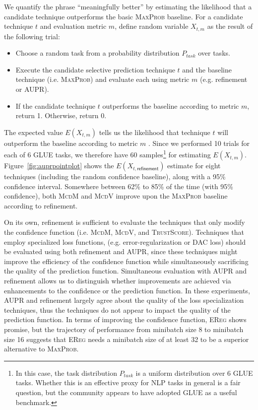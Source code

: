 \documentclass[11pt]{article}
\begin{document}
We quantify the phrase ``meaningfully better'' by estimating the likelihood that a candidate technique outperforms the basic \textsc{MaxProb} baseline. For a candidate technique $t$ and evaluation metric $m$, define random variable $X_{t,m}$ as the result of the following trial: 

\begin{itemize}
\item Choose a random task from a probability distribution $P_{task}$ over tasks.
\item Execute the candidate selective prediction technique $t$ and the baseline technique (i.e. \textsc{MaxProb}) and evaluate each using metric $m$ (e.g. refinement or \textsc{AUPR}).
\item If the candidate technique $t$ outperforms the baseline according to metric $m$, return 1. Otherwise, return 0.
\end{itemize}


\noindent The expected value $E(X_{t,m})$ tells us the likelihood that technique $t$ will outperform the baseline according to metric $m$ . Since we performed 10 trials for each of 6 GLUE tasks, we therefore have 60 samples\footnote{In this case, the task distribution $P_{task}$ is a uniform distribution over 6 GLUE tasks. Whether this is an effective proxy for NLP tasks in general is a fair question, but the community appears to have adopted GLUE as a useful benchmark.} for estimating $E(X_{t,m})$. Figure~\ref{fig:auprpointplot} shows the $E(X_{t,\mathsf{refinement}})$ estimate for eight techniques (including the random confidence baseline), along with a 95\% confidence interval. Somewhere between 62\% to 85\% of the time (with 95\% confidence), both \textsc{McdM} and \textsc{McdV} improve upon the \textsc{MaxProb} baseline according to refinement.  

On its own, refinement is sufficient to evaluate the techniques that only modify the confidence function (i.e. \textsc{McdM}, \textsc{McdV}, and \textsc{TrustScore}). Techniques that employ specialized loss functions, (e.g. error-regularization or DAC loss) should be evaluated using both refinement and AUPR, since these techniques might improve the efficiency of the confidence function while simultaneously sacrificing the quality of the prediction function. Simultaneous evaluation with AUPR and refinement allows us to distinguish whether improvements are achieved via enhancements to the confidence or the prediction function. In these experiments, AUPR and refinement largely agree about the quality of the loss specialization techniques, thus the techniques do not appear to impact the quality of the prediction function. In terms of improving the confidence function, \textsc{EReg} shows promise, but the trajectory of performance from minibatch size 8 to minibatch size 16 suggests that \textsc{EReg} needs a minibatch size of at least 32 to be a superior alternative to \textsc{MaxProb}.
\end{document}

